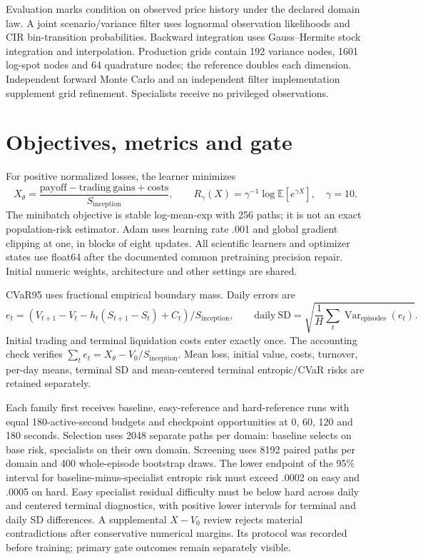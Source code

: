 Evaluation marks condition on observed price history under the declared domain law. A joint scenario/variance filter uses lognormal observation likelihoods and CIR bin-transition probabilities. Backward integration uses Gauss--Hermite stock integration and interpolation. Production grids contain 192 variance nodes, 1601 log-spot nodes and 64 quadrature nodes; the reference doubles each dimension. Independent forward Monte Carlo and an independent filter implementation supplement grid refinement. Specialists receive no privileged observations.

\section*{Objectives, metrics and gate}
For positive normalized losses, the learner minimizes
\[
X_\theta=\frac{\mathrm{payoff}-\mathrm{trading\ gains}+\mathrm{costs}}{S_{\mathrm{inception}}},\qquad
R_\gamma(X)=\gamma^{-1}\log\mathbb E[e^{\gamma X}],\quad\gamma=10.
\]
The minibatch objective is stable log-mean-exp with 256 paths; it is not an exact population-risk estimator. Adam uses learning rate .001 and global gradient clipping at one, in blocks of eight updates. All scientific learners and optimizer states use float64 after the documented common pretraining precision repair. Initial numeric weights, architecture and other settings are shared.

CVaR95 uses fractional empirical boundary mass. Daily errors are
\[
e_t=(V_{t+1}-V_t-h_t(S_{t+1}-S_t)+C_t)/S_{\mathrm{inception}},\qquad
\mathrm{daily\ SD}=\sqrt{\frac1H\sum_t\operatorname{Var}_{\mathrm{episodes}}(e_t)}.
\]
Initial trading and terminal liquidation costs enter exactly once. The accounting check verifies $\sum_t e_t=X_\theta-V_0/S_{\mathrm{inception}}$. Mean loss, initial value, costs, turnover, per-day means, terminal SD and mean-centered terminal entropic/CVaR risks are retained separately.

Each family first receives baseline, easy-reference and hard-reference runs with equal 180-active-second budgets and checkpoint opportunities at 0, 60, 120 and 180 seconds. Selection uses 2048 separate paths per domain: baseline selects on base risk, specialists on their own domain. Screening uses 8192 paired paths per domain and 400 whole-episode bootstrap draws. The lower endpoint of the 95\% interval for baseline-minus-specialist entropic risk must exceed .0002 on easy and .0005 on hard. Easy specialist residual difficulty must be below hard across daily and centered terminal diagnostics, with positive lower intervals for terminal and daily SD differences. A supplemental $X-V_0$ review rejects material contradictions after conservative numerical margins. Its protocol was recorded before training; primary gate outcomes remain separately visible.


